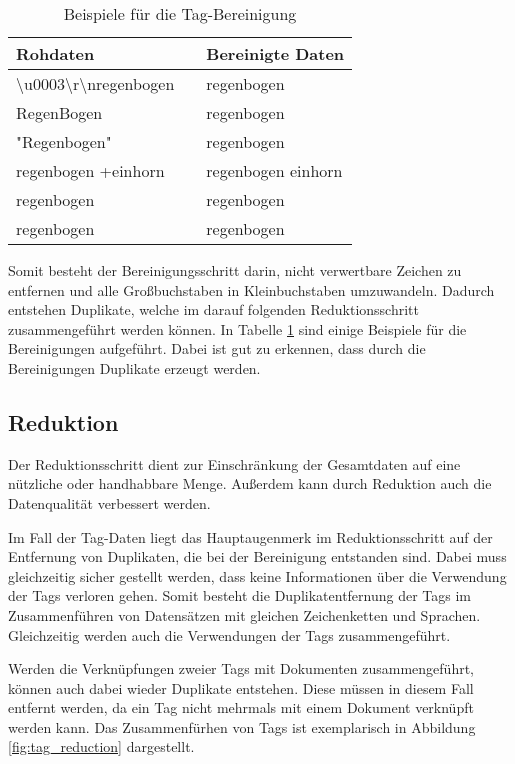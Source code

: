 \begin{table}
\centering
\begin{tabular}{lcl}
    \toprule
    Rohdaten & \phantom{abc} & Bereinigte Daten \\
    \midrule
    \textbackslash u0003\textbackslash r\textbackslash nregenbogen && regenbogen \\
    RegenBogen && regenbogen \\
    "Regenbogen" && regenbogen \\
    regenbogen +einhorn && regenbogen einhorn\\
    \phantom{abc} regenbogen && regenbogen \\
    regenbogen && regenbogen \\
    \bottomrule
\end{tabular}
\caption{Beispiele für die Tag-Bereinigung}
\label{tab:tag_cleaning}
\end{table}

Somit besteht der Bereinigungsschritt darin, nicht verwertbare Zeichen zu entfernen und alle Großbuchstaben in Kleinbuchstaben umzuwandeln. Dadurch entstehen Duplikate, welche im darauf folgenden Reduktionsschritt zusammengeführt werden können. In Tabelle \ref{tab:tag_cleaning} sind einige Beispiele für die Bereinigungen aufgeführt. Dabei ist gut zu erkennen, dass durch die Bereinigungen Duplikate erzeugt werden.

\subsection{Reduktion}

Der Reduktionsschritt dient zur Einschränkung der Gesamtdaten auf eine nützliche oder handhabbare Menge. Außerdem kann durch Reduktion auch die Datenqualität verbessert werden.

Im Fall der Tag-Daten liegt das Hauptaugenmerk im Reduktionsschritt auf der Entfernung von Duplikaten, die bei der Bereinigung entstanden sind. Dabei muss gleichzeitig sicher gestellt werden, dass keine Informationen über die Verwendung der Tags verloren gehen. Somit besteht die Duplikatentfernung der Tags im Zusammenführen von Datensätzen mit gleichen Zeichenketten und Sprachen. Gleichzeitig werden auch die Verwendungen der Tags zusammengeführt.

Werden die Verknüpfungen zweier Tags mit Dokumenten zusammengeführt, können auch dabei wieder Duplikate entstehen. Diese müssen in diesem Fall entfernt werden, da ein Tag nicht mehrmals mit einem Dokument verknüpft werden kann. Das Zusammenfürhen von Tags ist exemplarisch in Abbildung \ref{fig:tag_reduction} dargestellt.

